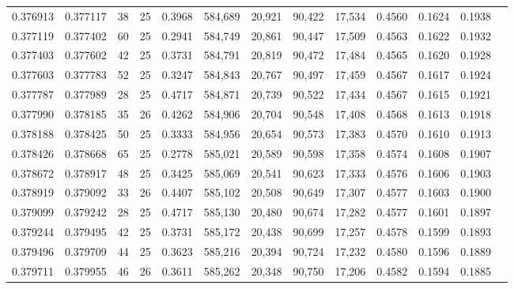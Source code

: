 \begin{tabular}{rrrrrrrrrrrrr}
0.376913 & 0.377117 &    38 &  25 &                                     0.3968 & 584,689 &  20,921 &  90,422 &  17,534 & 0.4560 & 0.1624 & 0.1938 \\
0.377119 & 0.377402 &    60 &  25 &                                     0.2941 & 584,749 &  20,861 &  90,447 &  17,509 & 0.4563 & 0.1622 & 0.1932 \\
0.377403 & 0.377602 &    42 &  25 &                                     0.3731 & 584,791 &  20,819 &  90,472 &  17,484 & 0.4565 & 0.1620 & 0.1928 \\
0.377603 & 0.377783 &    52 &  25 &                                     0.3247 & 584,843 &  20,767 &  90,497 &  17,459 & 0.4567 & 0.1617 & 0.1924 \\
0.377787 & 0.377989 &    28 &  25 &                                     0.4717 & 584,871 &  20,739 &  90,522 &  17,434 & 0.4567 & 0.1615 & 0.1921 \\
0.377990 & 0.378185 &    35 &  26 &                                     0.4262 & 584,906 &  20,704 &  90,548 &  17,408 & 0.4568 & 0.1613 & 0.1918 \\
0.378188 & 0.378425 &    50 &  25 &                                     0.3333 & 584,956 &  20,654 &  90,573 &  17,383 & 0.4570 & 0.1610 & 0.1913 \\
0.378426 & 0.378668 &    65 &  25 &                                     0.2778 & 585,021 &  20,589 &  90,598 &  17,358 & 0.4574 & 0.1608 & 0.1907 \\
0.378672 & 0.378917 &    48 &  25 &                                     0.3425 & 585,069 &  20,541 &  90,623 &  17,333 & 0.4576 & 0.1606 & 0.1903 \\
0.378919 & 0.379092 &    33 &  26 &                                     0.4407 & 585,102 &  20,508 &  90,649 &  17,307 & 0.4577 & 0.1603 & 0.1900 \\
0.379099 & 0.379242 &    28 &  25 &                                     0.4717 & 585,130 &  20,480 &  90,674 &  17,282 & 0.4577 & 0.1601 & 0.1897 \\
0.379244 & 0.379495 &    42 &  25 &                                     0.3731 & 585,172 &  20,438 &  90,699 &  17,257 & 0.4578 & 0.1599 & 0.1893 \\
0.379496 & 0.379709 &    44 &  25 &                                     0.3623 & 585,216 &  20,394 &  90,724 &  17,232 & 0.4580 & 0.1596 & 0.1889 \\
0.379711 & 0.379955 &    46 &  26 &                                     0.3611 & 585,262 &  20,348 &  90,750 &  17,206 & 0.4582 & 0.1594 & 0.1885 \\

\end{tabular}
